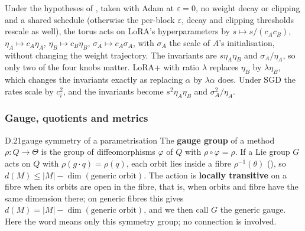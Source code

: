 Under the hypotheses of , taken with Adam at $\varepsilon=0$, no weight decay or clipping and a
shared schedule (otherwise the per-block $\varepsilon$, decay and clipping thresholds rescale as well), the torus acts
on LoRA's hyperparameters by $s\mapsto s/(c_Ac_B)$, $\eta_A\mapsto c_A\eta_A$, $\eta_B\mapsto c_B\eta_B$,
$\sigma_A\mapsto c_A\sigma_A$, with $\sigma_A$ the scale of $A$'s initialisation, without changing the weight
trajectory. The invariants are $s\eta_A\eta_B$ and $\sigma_A/\eta_A$, so only two of the four knobs matter. LoRA+
\citep{hayou2024lora} with ratio $\lambda$ replaces $\eta_B$ by $\lambda\eta_B$, which changes the invariants exactly as
replacing $\alpha$ by $\lambda\alpha$ does. Under SGD the rates scale by $c_i^2$, and the invariants become
$s^2\eta_A\eta_B$ and $\sigma_A^2/\eta_A$.


\subsubsection*{Gauge, quotients and metrics}

\begin{bgentry}{D.21}{gauge symmetry of a parametrisation}
The \textbf{gauge group} of a method $\rho:Q\to\Theta$ is the group of diffeomorphisms $\varphi$ of $Q$ with
$\rho\circ\varphi=\rho$. If a Lie group $G$ acts on $Q$ with $\rho(g\cdot q)=\rho(q)$, each orbit lies inside a fibre
$\rho^{-1}(\theta)$ (), so $d(M)\le\lvert M\rvert-\dim(\text{generic orbit})$. The action is \textbf{locally
transitive} on a fibre when its orbits are open in the fibre, that is, when orbits and fibre have the same dimension
there; on generic fibres this gives $d(M)=\lvert M\rvert-\dim(\text{generic orbit})$, and we then call $G$ the generic
gauge. Here the word means only this symmetry group; no connection is involved.
\end{bgentry}


